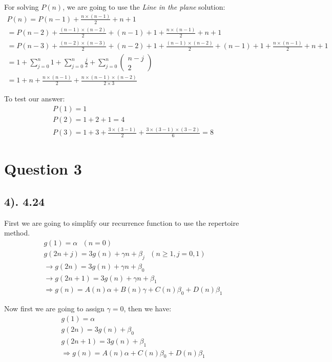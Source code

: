 \documentclass[12pt]{article}
\begin{document}
For solving $P(n)$, we are going to use the \textit{Line in the plane} solution:
\begin{gather*}
    P(n) = P(n-1) + \frac{n \times (n-1)}{2} + n + 1 \\
    = P(n-2) + \frac{(n-1) \times (n-2)}{2} + (n-1) + 1 + \frac{n \times (n-1)}{2} + n + 1  \\
    = P(n-3) + \frac{(n-2) \times (n-3)}{2} + (n-2) + 1 + \frac{(n-1) \times (n-2)}{2} + (n-1) + 1 + \frac{n \times (n-1)}{2} + n + 1  \\
    = 1 + \sum_{j=0}^n 1 + \sum_{j=0}^n \frac{j}{2} + \sum_{j=0}^n \begin{pmatrix} n-j \\ 2 \end{pmatrix} \\
    = 1 + n + \frac{n \times (n-1)}{2} + \frac{n \times (n-1) \times (n-2)}{2 \times 3}
\end{gather*}

To test our answer:
\begin{gather*}
    P(1) = 1 \\
    P(2) = 1 + 2 + 1 = 4 \\
    P(3) = 1 + 3 + \frac{3 \times (3-1)}{2} + \frac{3 \times (3-1) \times (3-2)}{6} = 8
\end{gather*}

\section*{Question 3}
\subsection*{4). 4.24}
First we are going to simplify our recurrence function to use the repertoire method.
\begin{gather*}
    g(1) = \alpha \text{ $(n=0)$} \\
    g(2n+j) = 3g(n) + \gamma n + \beta_{j} \text{ $(n \geq 1, j=0,1)$} \\
    \to g(2n) = 3g(n) + \gamma n + \beta_{0} \\
    \to g(2n+1) = 3g(n) + \gamma n + \beta_{1} \\
    \Rightarrow g(n) = A(n) \alpha + B(n) \gamma + C(n) \beta_{0} + D(n) \beta_{1}
\end{gather*}

Now first we are going to assign $\gamma = 0$, then we have:
\begin{gather*}
    g(1) = \alpha \\
    g(2n) = 3g(n) + \beta_{0} \\
    g(2n+1) = 3g(n) + \beta_{1} \\
    \Rightarrow g(n) = A(n) \alpha + C(n) \beta_{0} + D(n) \beta_{1}
\end{gather*}
\end{document}
